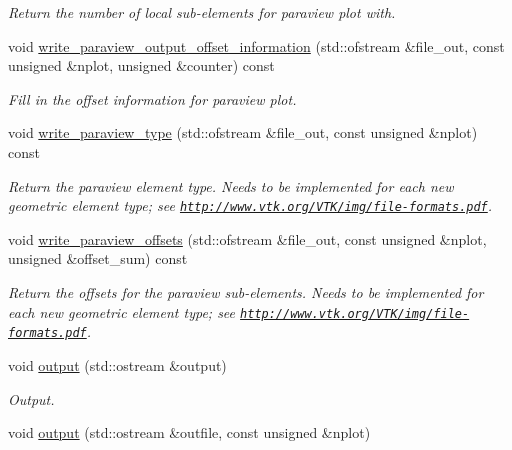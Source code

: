 \begin{DoxyCompactItemize}
\begin{DoxyCompactList}\small\item\em Return the number of local sub-\/elements for paraview plot with. \end{DoxyCompactList}\item 
void \hyperlink{classoomph_1_1TElement_3_013_00_01NNODE__1D_01_4_a897752cdeaa4920ea6d78aaad0b02919}{write\+\_\+paraview\+\_\+output\+\_\+offset\+\_\+information} (std\+::ofstream \&file\+\_\+out, const unsigned \&nplot, unsigned \&counter) const
\begin{DoxyCompactList}\small\item\em Fill in the offset information for paraview plot. \end{DoxyCompactList}\item 
void \hyperlink{classoomph_1_1TElement_3_013_00_01NNODE__1D_01_4_abda3d4f46f24a4b1c716a706374c5077}{write\+\_\+paraview\+\_\+type} (std\+::ofstream \&file\+\_\+out, const unsigned \&nplot) const
\begin{DoxyCompactList}\small\item\em Return the paraview element type. Needs to be implemented for each new geometric element type; see \href{http://www.vtk.org/VTK/img/file-formats.pdf}{\tt http\+://www.\+vtk.\+org/\+V\+T\+K/img/file-\/formats.\+pdf}. \end{DoxyCompactList}\item 
void \hyperlink{classoomph_1_1TElement_3_013_00_01NNODE__1D_01_4_ac520bc1079c1ad3433d76ba0978ea6af}{write\+\_\+paraview\+\_\+offsets} (std\+::ofstream \&file\+\_\+out, const unsigned \&nplot, unsigned \&offset\+\_\+sum) const
\begin{DoxyCompactList}\small\item\em Return the offsets for the paraview sub-\/elements. Needs to be implemented for each new geometric element type; see \href{http://www.vtk.org/VTK/img/file-formats.pdf}{\tt http\+://www.\+vtk.\+org/\+V\+T\+K/img/file-\/formats.\+pdf}. \end{DoxyCompactList}\item 
void \hyperlink{classoomph_1_1TElement_3_013_00_01NNODE__1D_01_4_a16ce587e9046f02d9861b6d9d2847a84}{output} (std\+::ostream \&output)
\begin{DoxyCompactList}\small\item\em Output. \end{DoxyCompactList}\item 
void \hyperlink{classoomph_1_1TElement_3_013_00_01NNODE__1D_01_4_afbe11abf64903e58d4d265ea503a5af0}{output} (std\+::ostream \&outfile, const unsigned \&nplot)

\end{DoxyCompactItemize}

